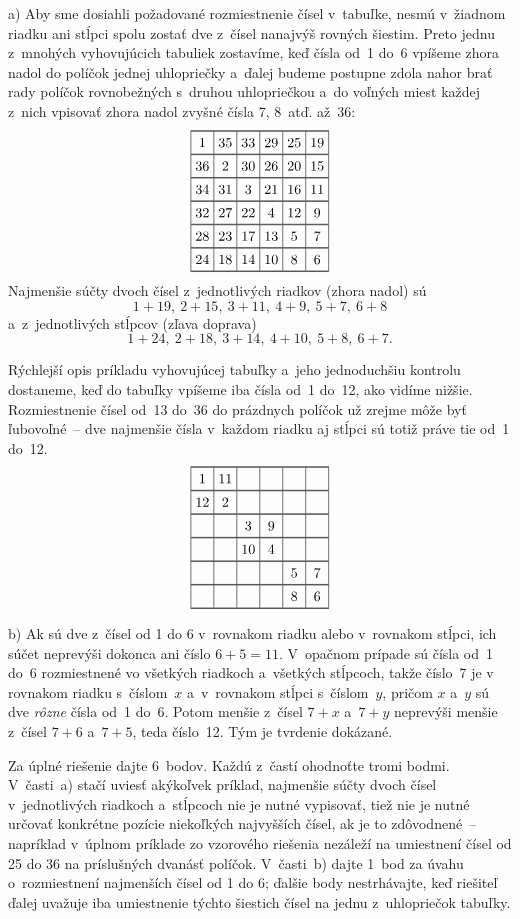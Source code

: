 {%
a) Aby sme dosiahli požadované rozmiestnenie čísel v~tabuľke,
nesmú v~žiadnom riadku ani stĺpci spolu zostať
dve z~čísel nanajvýš rovných šiestim. Preto
jednu z~mnohých vyhovujúcich tabuliek zostavíme, keď čísla od~1
do~6 vpíšeme zhora nadol do políčok jednej uhlopriečky a~ďalej
budeme postupne zdola nahor brať rady políčok rovnobežných s~druhou uhlopriečkou
a~do voľných miest každej z~nich vpisovať zhora nadol
zvyšné čísla 7, 8~atď. až~36:
$$
\vbox
{\offinterlineskip\everycr{\noalign{\hrule}}\let\par\cr\obeylines %
\halign{\vrule#&&\hbox to 16pt{\hss#\unskip\hss}\vrule height 11.2pt depth 4.8pt\cr
& 1&35&33&29&25&19\cr
&36& 2&30&26&20&15\cr
&34&31& 3&21&16&11\cr
&32&27&22& 4&12& 9\cr
&28&23&17&13& 5& 7\cr
&24&18&14&10& 8& 6\cr
}}
$$
Najmenšie súčty dvoch čísel z~jednotlivých riadkov (zhora nadol) sú
$$
1+19,\ 2+15,\ 3+11,\ 4+9,\ 5+7,\ 6+8
$$
a~z~jednotlivých stĺpcov (zľava doprava)
$$
1+24,\ 2+18,\ 3+14,\ 4+10,\ 5+8,\ 6+7.
$$

Rýchlejší opis príkladu vyhovujúcej tabuľky a~jeho jednoduchšiu kontrolu dostaneme,
keď do tabuľky vpíšeme iba čísla od~1 do~12, ako vidíme nižšie. Rozmiestnenie
čísel od~13 do~36 do prázdnych políčok už zrejme môže byť ľubovoľné~-- dve najmenšie
čísla v~každom riadku aj stĺpci sú totiž práve tie od~1 do~12.
$$
\vbox
{\offinterlineskip\everycr{\noalign{\hrule}}\let\par\cr\obeylines %
\halign{\vrule#&&\hbox to 16pt{\hss#\unskip\hss}\vrule height 11.2pt depth 4.8pt\cr
&1 &11& & & &\cr
&12& 2& & & &\cr
& & & 3&9 & &\cr
& & &10&4 & &\cr
& & & & &5&7\cr
& & & & &8&6\cr
}}
$$


b) Ak sú dve z~čísel od 1 do 6 v~rovnakom riadku alebo v~rovnakom
stĺpci, ich súčet neprevýši dokonca ani číslo $6+5=11$.
V~opačnom prípade sú čísla od~1 do~6 rozmiestnené vo všetkých riadkoch
a~všetkých stĺpcoch, takže číslo~7 je v rovnakom riadku s~číslom~$x$
a~v~rovnakom stĺpci s~číslom~$y$, pričom $x$ a~$y$ sú dve {\it
rôzne\/} čísla od~1 do~6. Potom menšie z~čísel $7+x$ a~$7+y$
neprevýši menšie z~čísel $7+6$ a~$7+5$, teda číslo~12. Tým je tvrdenie
dokázané.


\nobreak\medskip\petit\noindent
Za úplné riešenie dajte 6~bodov.
Každú z~častí ohodnoťte tromi bodmi. V~časti~a) stačí uviesť akýkoľvek príklad,
najmenšie súčty dvoch čísel v~jednotlivých riadkoch a~stĺpcoch nie je nutné vypisovať,
tiež nie je nutné určovať konkrétne pozície niekoľkých najvyšších čísel, ak je to zdôvodnené~--
napríklad v~úplnom príklade zo vzorového riešenia nezáleží na umiestnení čísel od 25 do 36
na príslušných dvanásť políčok. V~časti~b) dajte 1~bod za úvahu o~rozmiestnení najmenších
čísel od 1 do 6; ďalšie body nestrhávajte, keď riešiteľ ďalej uvažuje iba umiestnenie
týchto šiestich čísel na jednu z~uhlopriečok tabuľky.
\endpetit
\bigbreak
}

